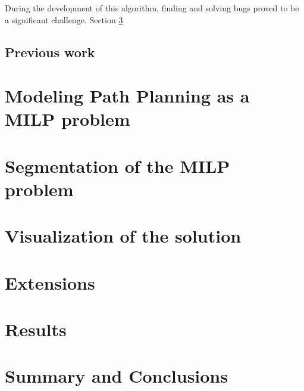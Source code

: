 \documentclass[12pt]{article}
\begin{document}
During the development of this algorithm, finding and solving bugs proved to be a significant challenge. Section \ref{section:visual} 

\subsection{Previous work}
\label{subsec:previous}


\section{Modeling Path Planning as a MILP problem}
\label{section:modeling}

\section{Segmentation of the MILP problem}
\label{section:segment}

\section{Visualization of the solution}
\label{section:visual}

\section{Extensions}
\label{section:extension}

\section{Results}
\label{section:result}

\section{Summary and Conclusions}
\label{section:summarry}



\end{document}
